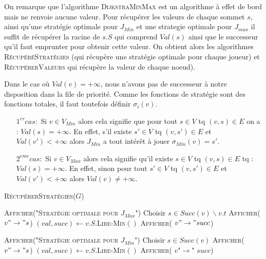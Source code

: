 On remarque que l'algorithme \textsc{DijkstraMinMax}  est un algorithme à effet de bord mais ne renvoie aucune valeur. Pour récupérer les valeurs de chaque sommet $s$, ainsi qu'une stratégie optimale pour $J_{Min}$ et une strategie optimale pour $J_{max}$ il suffit de récupérer la racine de $s.S$ qui comprend $Val(s)$ ainsi que le successeur qu'il faut emprunter pour obtenir cette valeur. On obtient alors les algorithmes \textsc{RécupéréStratégies} (qui récupère une stratégie optimale pour chaque joueur) et \textsc{RécupérerValeurs} qui récupère la valeur de chaque noeud).

\begin{rem}
	
	Dans le cas où $Val(v) = +\infty$, nous n'avons pas de successeur à notre disposition dans la file de priorité. Comme les fonctions de stratégie sont des fonctions totales, il faut toutefois définir $\sigma _{i} (v)$.
\begin{enumerate}
	\item[$1^{er} cas:$] Si $v \in V_{Min}$ alors cela signifie que pour tout $s \in V$ tq $(v,s) \in E$ on a : $Val(s) = +\infty$. En effet, s'il existe $s' \in V$ tq $(v,s')\in E$ et $Val(v') < +\infty$ alors $J_{Min}$ a tout intérêt à jouer $\sigma _{Min}(v) = s'$.
	\item[$2^{eme} cas:$] Si $v \in V_{Max}$ alors cela signifie qu'il existe $s \in V$ tq $(v,s) \in E$ tq : $Val(s) = +\infty$. En effet, sinon pour tout $s' \in V$ tq $(v,s') \in E$ et $Val(v') < +\infty$ alors $Val(v) \neq +\infty$. 
	
\end{enumerate}

\end{rem}

\begin{algorithm}
	\caption{\textsc{RécupérerStratégies}($G$)}
	\label{algo:recupStrat}
	\begin{algorithmic}[1]
	
	\STATE \textsc{Afficher("Stratégie optimale pour $J_{Max}$")}
			\STATE Choisir $s \in Succ(v) \backslash v.t$
			\STATE \textsc{Afficher( $v " \rightarrow " s$)}
		\ELSE
			\STATE $(val,succ) \leftarrow v.S.$\textsc{Lire-Min}$()$
			\STATE \textsc{Afficher( $v " \rightarrow " succ$)}
		\ENDIF
	\ENDFOR
	
	\STATE \textsc{Afficher("Stratégie optimale pour $J_{Min}$")}
			\STATE Choisir $s \in Succ(v)$
			\STATE \textsc{Afficher( $v " \rightarrow " s$)}
		\ELSE	
			\STATE $(val,succ) \leftarrow v.S.$\textsc{Lire-Min}$()$
			\STATE \textsc{Afficher( $v $"$ \rightarrow $" $succ$)}
		\ENDIF
	\ENDFOR
	
	\end{algorithmic}
\end{algorithm}

